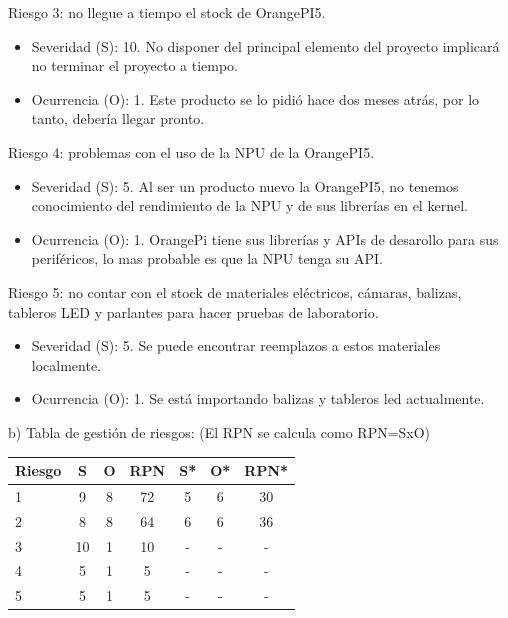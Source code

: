 \documentclass[
11pt, %
]{charter}
\begin{document}
Riesgo 3: no llegue a tiempo el stock de OrangePI5.
\begin{itemize}
	\item Severidad (S): 10. No disponer del principal elemento del proyecto implicará no terminar el proyecto a tiempo.
	\item Ocurrencia (O): 1. Este producto se lo pidió hace dos meses atrás, por lo tanto, debería llegar pronto.
\end{itemize}

Riesgo 4: problemas con el uso de la NPU de la OrangePI5.
\begin{itemize}
	\item Severidad (S): 5. Al ser un producto nuevo la OrangePI5, no tenemos conocimiento del rendimiento de la NPU y de sus librerías en el kernel.
	\item Ocurrencia (O): 1. OrangePi tiene sus librerías y APIs de desarollo para sus periféricos, lo mas probable es que la NPU tenga su API.
\end{itemize}

Riesgo 5: no contar con el stock de materiales eléctricos, cámaras, balizas, tableros LED y parlantes para hacer pruebas de laboratorio.
\begin{itemize}
	\item Severidad (S): 5. Se puede encontrar reemplazos a estos materiales localmente.
	\item Ocurrencia (O): 1. Se está importando balizas y tableros led actualmente.
\end{itemize}

b) Tabla de gestión de riesgos:      (El RPN se calcula como RPN=SxO)

\begin{table}[htpb]
\centering
\begin{tabularx}{\linewidth}{@{}|X|c|c|c|c|c|c|@{}}
\hline
\rowcolor[HTML]{C0C0C0} 
Riesgo & S & O & RPN & S* & O* & RPN* \\ \hline
1    & 9  & 8  &  72   &  5  & 6   &  30    \\ \hline
2    &  8 & 8  &  64  &   6 &   6 &   36   \\ \hline
3    & 10 & 1  &  10   & -   &  -  & -     \\ \hline
4    &  5 & 1  &   5  &   - &  -  &    -  \\ \hline
5    &  5 & 1  &   5  &   - &  -  &    -  \\ \hline
\end{tabularx}%
\end{table}
\end{document}
